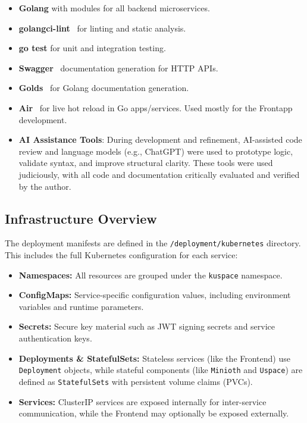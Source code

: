 \begin{itemize}
\item \textbf{Golang} with modules for all backend microservices.
\item \textbf{golangci-lint}~\cite{golangcilint} for linting and static analysis.
\item \textbf{go test} for unit and integration testing.
\item \textbf{Swagger}~\cite{swagger} documentation generation for HTTP APIs.
\item \textbf{Golds}~\cite{golds} for Golang documentation generation.
\item \textbf{Air}~\cite{air} for live hot reload in Go apps/services. Used mostly for the Frontapp development.
\item \textbf{AI Assistance Tools}: During development and refinement, AI-assisted code review and language 
models (e.g., ChatGPT) were used to prototype logic, validate syntax, and improve structural clarity. 
These tools were used judiciously, with all code and documentation critically evaluated and verified by 
the author.
\end{itemize}

\subsection{Infrastructure Overview}

The deployment manifests are defined in the \texttt{/deployment/kubernetes} directory. This includes the full Kubernetes configuration for each service:

\begin{itemize}
\item \textbf{Namespaces:} All resources are grouped under the \texttt{kuspace} namespace.
\item \textbf{ConfigMaps:} Service-specific configuration values, including environment variables and runtime parameters.
\item \textbf{Secrets:} Secure key material such as JWT signing secrets and service authentication keys.
\item \textbf{Deployments \& StatefulSets:} Stateless services (like the Frontend) use \texttt{Deployment} 
objects, while stateful components (like \texttt{Minioth} and \texttt{Uspace}) are defined as \texttt{StatefulSets} 
with persistent volume claims (PVCs).
\item \textbf{Services:} ClusterIP services are exposed internally for inter-service communication, 
while the Frontend may optionally be exposed externally.
\end{itemize}

